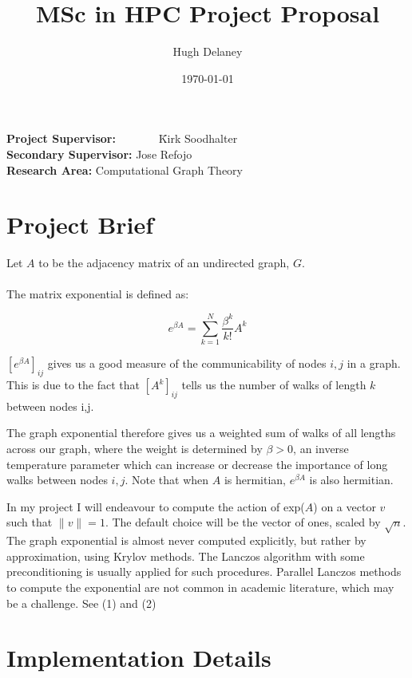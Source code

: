 \documentclass[a4paper, fleqn]{article}
\date{\today}
\author{Hugh Delaney}
\title{MSc in HPC Project Proposal}
\begin{document}
\maketitle
\begin{tabbing}
        \textbf{Project Supervisor:}~~~~~~~ \=Kirk Soodhalter \\
        \textbf{Secondary Supervisor:} \>Jose Refojo \\
        \textbf{Research Area:}  \> Computational Graph Theory \\
\end{tabbing}

\section*{Project Brief}%
\label{sec:project_brief}

Let $A$ to be the adjacency matrix of an undirected graph, $G$.
\\ \\
The matrix exponential is defined as:

\[ e^{\beta A} = \sum_{k=1}^{N} \frac{\beta^k}{k!}A^k \]

$[e^{\beta A}]_{ij}$ gives us a good measure of the communicability of nodes $i,j$ in a graph. This is due to the fact that $[A^k]_{ij}$ tells us the number of walks of length  $k$ between nodes i,j.

The graph exponential therefore gives us a weighted sum of walks of all lengths across our graph, where the weight is determined by $\beta > 0$, an inverse temperature parameter which can increase or decrease the importance of long walks between nodes $i,j$. Note that when $A$ is hermitian,  $e^{\beta A}$ is also hermitian.

In my project I will endeavour to compute the action of exp($A$) on a vector $v$ such that  $\|v\| = 1$. The default choice will be the vector of ones, scaled by $\sqrt{n}$. The graph exponential is almost never computed explicitly, but rather by approximation, using Krylov methods.  The Lanczos algorithm with some preconditioning is usually applied for such procedures. Parallel Lanczos methods to compute the exponential are not common in academic literature, which may be a challenge. See (1) and (2) 

\section*{Implementation Details}%
\label{sec:project_brief}
\end{document}
